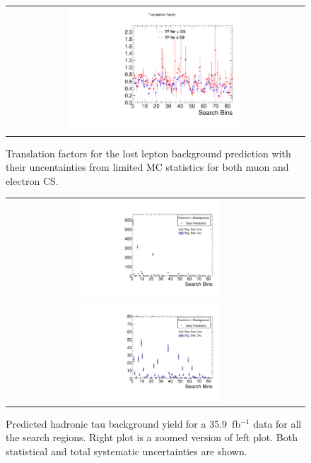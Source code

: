 \begin{figure}[htbp]
  \begin{center}
  \begin{tabular}{c}
  \includegraphics[angle=0,width=0.60\textwidth]{sections/mc4/Backgrounds/TF/figures/comp_TF_lostle_comb.pdf}
  \end{tabular}
  \caption{Translation factors for the lost lepton background prediction with their uncentainties from limited MC statistics for both muon and electron CS.}
    \label{fig:lostle_TF}
  \end{center}
\end{figure}

\begin{figure}[htbp]
  \begin{center}
  \begin{tabular}{cc}
  \includegraphics[angle=0,width=0.5\textwidth]{sections/mc4/Backgrounds/TF/figures/pred_full_hadtau_comb.pdf}
  \includegraphics[angle=0,width=0.5\textwidth]{sections/mc4/Backgrounds/TF/figures/pred_zoomin_hadtau_comb.pdf}
  \end{tabular}
  \caption{Predicted hadronic tau background yield for a $35.9$~fb$^{-1}$ data for all the search regions. Right plot is a zoomed version of left plot.
Both statistical and total systematic uncertainties are shown. }
    \label{fig:TAUpredictionSB}
  \end{center}
\end{figure}


